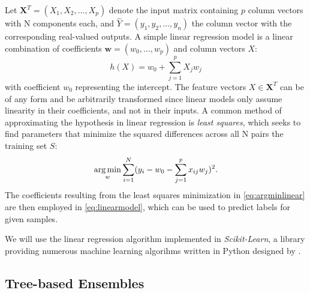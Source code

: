 Let $ \textbf{X}^{T} = (X_1, X_2, \dots, X_p) $ denote the input matrix containing $ p $ column vectors with N components each, and $ \hat{Y} = (y_1, y_2, \dots, y_n)$ the column vector with the corresponding real-valued outputs. A simple linear regression model is a linear combination of coefficients $ \mathbf{w} = (w_0, \dots, w_p) $ and column vectors $ X $:
\begin{equation}\label{eq:linearmodel}
h(X) = w_0 + \sum_{j=1}^{p} X_jw_j
\end{equation}
with coefficient $ w_0 $ representing the intercept. The feature vectors $ X \in \textbf{X}^{T} $ can be of any form and be arbitrarily transformed since linear models only assume linearity in their coefficients, and not in their inputs.
A common method of approximating the hypothesis in linear regression is \textit{least squares}, which seeks to find parameters that minimize the squared differences across all N pairs the training set $ S $:
\begin{equation}\label{eq:argminlinear}
\operatorname*{arg\,min}_{w} \sum_{i=1}^{N}(y_i - w_0 - \sum_{j=1}^{p} x_{ij}w_j)^2. 
\end{equation}
The coefficients resulting from the least squares minimization in \ref{eq:argminlinear} are then employed in \ref{eq:linearmodel}, which can be used to predict labels for given samples. 


We will use the linear regression algorithm implemented in \textit{Scikit-Learn}, a library providing numerous machine learning algorihms written in Python designed by \cite{scikit-learn}.
\subsection{Tree-based Ensembles}

